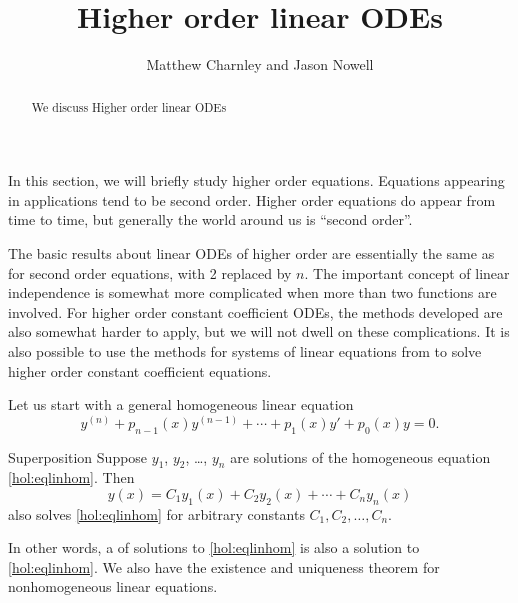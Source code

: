 \documentclass{ximera}
\title{Higher order linear ODEs}
\author{Matthew Charnley and Jason Nowell}
\begin{document}
\begin{abstract}
    We discuss Higher order linear ODEs
\end{abstract}
\maketitle

\label{sec:hol}




%

In this section, we will briefly study higher order equations. Equations appearing in applications tend to be second order.  Higher order equations do appear from time to time, but generally the world around us is ``second order''.

The basic results about linear ODEs of higher order are essentially the same as for second order equations, with 2 replaced by $n$. The important concept of linear independence is somewhat more complicated when more than two functions are involved. For higher order constant coefficient ODEs, the methods developed are also somewhat harder to apply, but we will not dwell on these complications. It is also possible to use the methods for systems of linear equations from  to solve higher order constant coefficient equations.

Let us start with a general homogeneous linear equation
\begin{equation} \label{hol:eqlinhom}
    y^{(n)} + p_{n-1}(x)y^{(n-1)} + \cdots + p_1(x) y' + p_0(x) y = 0 .
\end{equation}

\begin{theorem}{Superposition}
    Suppose $y_1$, $y_2$, \ldots, $y_n$ are solutions of the homogeneous equation \eqref{hol:eqlinhom}.  Then 
    \begin{equation*}
        y(x) = C_1 y_1(x) + C_2 y_2(x) + \cdots + C_n y_n(x) 
    \end{equation*}
    also solves \eqref{hol:eqlinhom} for arbitrary constants $C_1, C_2, \ldots, C_n$.
\end{theorem}

In other words, a \emph{} of solutions to \eqref{hol:eqlinhom} is also a solution to \eqref{hol:eqlinhom}. We also have the existence and uniqueness theorem for nonhomogeneous linear equations.
\end{document}

